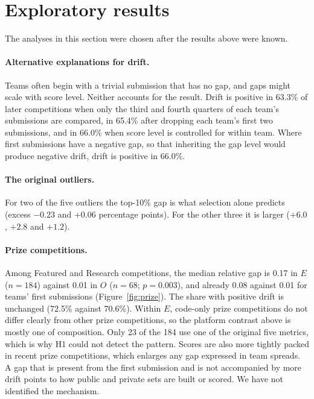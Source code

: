\documentclass[10pt]{article}
\begin{document}
\section{Exploratory results}
\label{sec:explore}

The analyses in this section were chosen after the results above were known.

\paragraph{Alternative explanations for drift.} Teams often begin with a trivial submission that has no gap, and gaps might scale with score level. Neither accounts for the result. Drift is positive in 63.3\% of later competitions when only the third and fourth quarters of each team's submissions are compared, in 65.4\% after dropping each team's first two submissions, and in 66.0\% when score level is controlled for within team. Where first submissions have a negative gap, so that inheriting the gap level would produce negative drift, drift is positive in 66.0\%.

\paragraph{The original outliers.} For two of the five outliers the top-10\% gap is what selection alone predicts (excess $-0.23$ and $+0.06$ percentage points). For the other three it is larger ($+6.0$, $+2.8$ and $+1.2$).

\paragraph{Prize competitions.} Among Featured and Research competitions, the median relative gap is 0.17 in $E$ ($n=184$) against 0.01 in $O$ ($n=68$; $p=0.003$), and already 0.08 against 0.01 for teams' first submissions (Figure~\ref{fig:prize}). The share with positive drift is unchanged (72.5\% against 70.6\%). Within $E$, code-only prize competitions do not differ clearly from other prize competitions, so the platform contrast above is mostly one of composition. Only 23 of the 184 use one of the original five metrics, which is why H1 could not detect the pattern. Scores are also more tightly packed in recent prize competitions, which enlarges any gap expressed in team spreads. A gap that is present from the first submission and is not accompanied by more drift points to how public and private sets are built or scored. We have not identified the mechanism.
\end{document}
